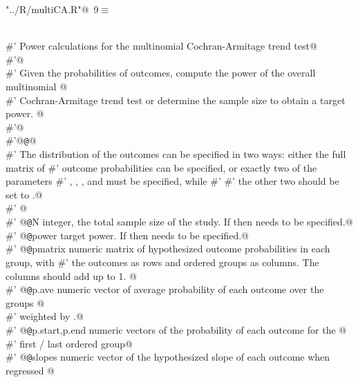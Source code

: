 \documentclass[reqno]{amsart}
\renewcommand{\NWtarget}[2]{\hypertarget{#1}{#2}}
\begin{document}
\begin{flushleft} \small\label{scrap14}\raggedright\small
\NWtarget{nuweb9}{} \verb@"../R/multiCA.R"@\nobreak\ {\footnotesize {9}}$\equiv$
\vspace{-1ex}
\begin{list}{}{} \item
\mbox{}\verb@@\\
\mbox{}\verb@#' Power calculations for the multinomial Cochran-Armitage trend test@\\
\mbox{}\verb@#'@\\
\mbox{}\verb@#' Given the probabilities of outcomes, compute the power of the overall multinomial @\\
\mbox{}\verb@#' Cochran-Armitage trend test or determine the sample size to obtain a target power. @\\
\mbox{}\verb@#'@\\
\mbox{}\verb@#'@{\tt @}\verb@details @\\
\mbox{}\verb@#' The distribution of the outcomes can be specified in two ways: either the full matrix of #' outcome probabilities  can be specified, or exactly two of the parameters #' , , , and  must be specified, while #' #' the other two should be set to .@\\
\mbox{}\verb@#' @\\
\mbox{}\verb@#' @{\tt @}\verb@param N integer, the total sample size of the study. If  then  needs to be specified.@\\
\mbox{}\verb@#' @{\tt @}\verb@param power target power. If  then  needs to be specified.@\\
\mbox{}\verb@#' @{\tt @}\verb@param pmatrix numeric matrix of hypothesized outcome probabilities in each group,  with #' the outcomes as rows and ordered groups as columns. The columns should add up to 1. @\\
\mbox{}\verb@#' @{\tt @}\verb@param p.ave numeric vector of average probability of each outcome over the groups  @\\
\mbox{}\verb@#' weighted by .@\\
\mbox{}\verb@#' @{\tt @}\verb@param p.start,p.end numeric vectors of the probability of each outcome for the  @\\
\mbox{}\verb@#' first / last ordered group@\\
\mbox{}\verb@#' @{\tt @}\verb@param slopes numeric vector of the hypothesized slope of each outcome when regressed  @\\

\end{list}
\end{flushleft}
\end{document}

